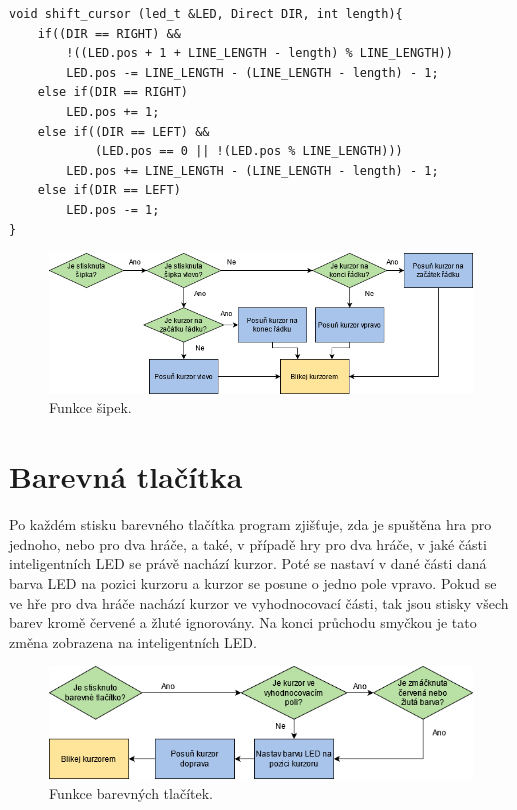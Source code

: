 \begin{minipage}{\linewidth}
\begin{lstlisting}[frame=single,numbers=right,caption={Funkce posouvající kurzor.},label=lst:priklad.vypis.kodu.C,basicstyle=\ttfamily\small, keywordstyle=\color{black}\bfseries\underbar,]
void shift_cursor (led_t &LED, Direct DIR, int length){
    if((DIR == RIGHT) && 
        !((LED.pos + 1 + LINE_LENGTH - length) % LINE_LENGTH))
        LED.pos -= LINE_LENGTH - (LINE_LENGTH - length) - 1;
    else if(DIR == RIGHT)
        LED.pos += 1;
    else if((DIR == LEFT) && 
            (LED.pos == 0 || !(LED.pos % LINE_LENGTH)))
        LED.pos += LINE_LENGTH - (LINE_LENGTH - length) - 1;
    else if(DIR == LEFT)
        LED.pos -= 1;
}   
\end{lstlisting}
\end{minipage} 

  \begin{figure}[!h]
    \begin{center}
      \includegraphics[scale=0.6]{obrazky/Sipka.png}
    \end{center}
    \caption[Funkce šipek]{Funkce šipek.}
  \end{figure}
    
\section{Barevná tlačítka}
Po každém stisku barevného tlačítka program zjišťuje, zda je spuštěna hra pro jednoho, nebo pro dva hráče, a také, v případě hry pro dva hráče,
v jaké části inteligentních LED se právě nachází kurzor. Poté se nastaví v dané části daná barva LED na pozici kurzoru a kurzor se posune o 
jedno pole vpravo. Pokud se ve hře pro dva hráče nachází kurzor ve vyhodnocovací části, tak jsou stisky všech barev kromě červené a žluté 
ignorovány. Na konci průchodu smyčkou je tato změna zobrazena na inteligentních LED. 

  \begin{figure}[!h]
    \begin{center}
      \includegraphics[scale=0.6]{obrazky/Barevne_tlacitko.png}
    \end{center}
    \caption[Funkce barevných tlačítek]{Funkce barevných tlačítek.}
  \end{figure}

